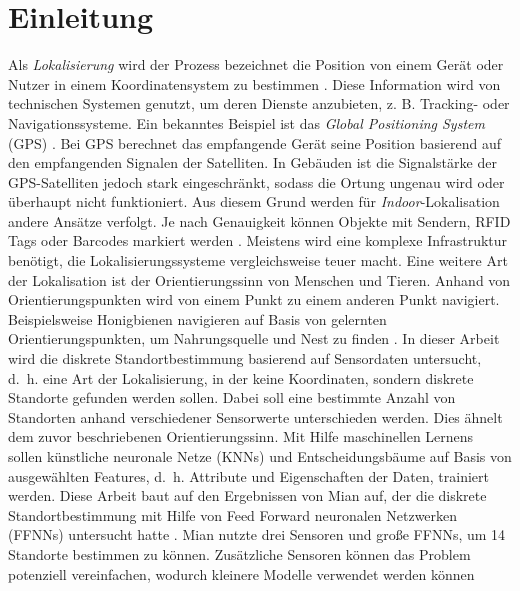 \chapter{Einleitung}
Als \textit{Lokalisierung} wird der Prozess bezeichnet die Position von einem Gerät oder Nutzer in einem Koordinatensystem zu bestimmen \cite{bulusu2000gps}.
Diese Information wird von technischen Systemen genutzt, um deren Dienste anzubieten, z. B. Tracking- oder Navigationssysteme.
Ein bekanntes Beispiel ist das \textit{Global Positioning System} (GPS) \cite{kaplan2005understanding}.
Bei GPS berechnet das empfangende Gerät seine Position basierend auf den empfangenden Signalen der Satelliten.
\newline
\newline
In Gebäuden ist die Signalstärke der GPS-Satelliten jedoch stark eingeschränkt, sodass die Ortung ungenau wird oder überhaupt nicht funktioniert.
Aus diesem Grund werden für \textit{Indoor}-Lokalisation andere Ansätze verfolgt.
Je nach Genauigkeit können Objekte mit Sendern, RFID Tags oder Barcodes markiert werden \cite{xiao2016survey}.
Meistens wird eine komplexe Infrastruktur benötigt, die Lokalisierungssysteme vergleichsweise teuer macht.
\newline
\newline
Eine weitere Art der Lokalisation ist der Orientierungssinn von Menschen und Tieren.
Anhand von Orientierungspunkten wird von einem Punkt zu einem anderen Punkt navigiert.
Beispielsweise Honigbienen navigieren auf Basis von gelernten Orientierungspunkten, um Nahrungsquelle und Nest zu finden \cite{menzel1996knowledge}.
\newline
\newline
In dieser Arbeit wird die diskrete Standortbestimmung basierend auf Sensordaten untersucht,
d.~h. eine Art der Lokalisierung, in der keine Koordinaten, sondern diskrete Standorte gefunden werden sollen.
Dabei soll eine bestimmte Anzahl von Standorten anhand verschiedener Sensorwerte unterschieden werden.
Dies ähnelt dem zuvor beschriebenen Orientierungssinn.
Mit Hilfe maschinellen Lernens sollen künstliche neuronale Netze (KNNs) und Entscheidungsbäume
auf Basis von ausgewählten Features, d.~h. Attribute und Eigenschaften der Daten, trainiert werden.
Diese Arbeit baut auf den Ergebnissen von Mian auf, der die diskrete Standortbestimmung mit Hilfe von
Feed Forward neuronalen Netzwerken (FFNNs) untersucht hatte \cite{naveedThesis}.
Mian nutzte drei Sensoren und große FFNNs, um 14 Standorte bestimmen zu können.
Zusätzliche Sensoren können das Problem potenziell vereinfachen, wodurch kleinere Modelle verwendet werden können
